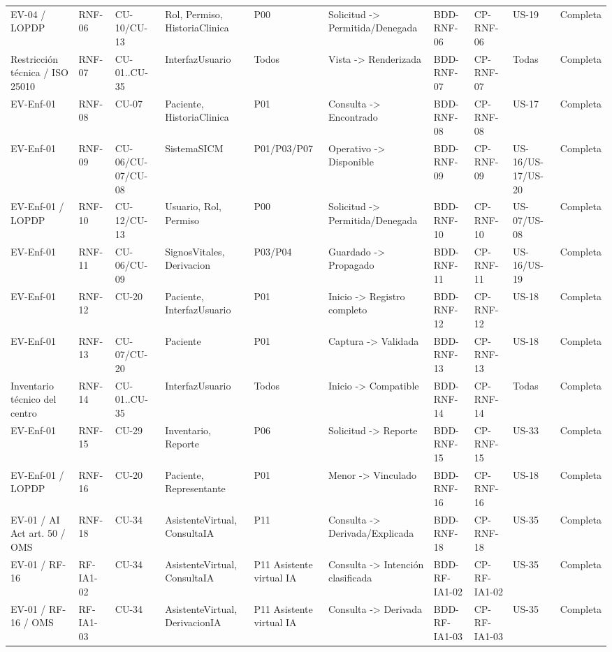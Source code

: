 \documentclass[11pt,a4paper]{article}
\begin{document}
\begin{appendices}
\begin{landscape}
\begin{longtable}{p{2.2cm}p{1.8cm}p{2cm}p{3cm}p{3cm}p{3cm}p{2cm}p{2cm}p{2cm}p{1.6cm}}
			EV-04 / LOPDP & RNF-06 & CU-10/CU-13 & Rol, Permiso, HistoriaClinica & P00 & Solicitud -> Permitida/Denegada & BDD-RNF-06 & CP-RNF-06 & US-19 & Completa\\
			Restricción técnica / ISO 25010 & RNF-07 & CU-01..CU-35 & InterfazUsuario & Todos & Vista -> Renderizada & BDD-RNF-07 & CP-RNF-07 & Todas & Completa\\
			EV-Enf-01 & RNF-08 & CU-07 & Paciente, HistoriaClinica & P01 & Consulta -> Encontrado & BDD-RNF-08 & CP-RNF-08 & US-17 & Completa\\
			EV-Enf-01 & RNF-09 & CU-06/CU-07/CU-08 & SistemaSICM & P01/P03/P07 & Operativo -> Disponible & BDD-RNF-09 & CP-RNF-09 & US-16/US-17/US-20 & Completa\\
			EV-Enf-01 / LOPDP & RNF-10 & CU-12/CU-13 & Usuario, Rol, Permiso & P00 & Solicitud -> Permitida/Denegada & BDD-RNF-10 & CP-RNF-10 & US-07/US-08 & Completa\\
			EV-Enf-01 & RNF-11 & CU-06/CU-09 & SignosVitales, Derivacion & P03/P04 & Guardado -> Propagado & BDD-RNF-11 & CP-RNF-11 & US-16/US-19 & Completa\\
			EV-Enf-01 & RNF-12 & CU-20 & Paciente, InterfazUsuario & P01 & Inicio -> Registro completo & BDD-RNF-12 & CP-RNF-12 & US-18 & Completa\\
			EV-Enf-01 & RNF-13 & CU-07/CU-20 & Paciente & P01 & Captura -> Validada & BDD-RNF-13 & CP-RNF-13 & US-18 & Completa\\
			Inventario técnico del centro & RNF-14 & CU-01..CU-35 & InterfazUsuario & Todos & Inicio -> Compatible & BDD-RNF-14 & CP-RNF-14 & Todas & Completa\\
			EV-Enf-01 & RNF-15 & CU-29 & Inventario, Reporte & P06 & Solicitud -> Reporte & BDD-RNF-15 & CP-RNF-15 & US-33 & Completa\\
			EV-Enf-01 / LOPDP & RNF-16 & CU-20 & Paciente, Representante & P01 & Menor -> Vinculado & BDD-RNF-16 & CP-RNF-16 & US-18 & Completa\\
			EV-01 / AI Act art. 50 / OMS & RNF-18 & CU-34 & AsistenteVirtual, ConsultaIA & P11 & Consulta -> Derivada/Explicada & BDD-RNF-18 & CP-RNF-18 & US-35 & Completa\\
			EV-01 / RF-16 & RF-IA1-02 & CU-34 & AsistenteVirtual, ConsultaIA & P11 Asistente virtual IA & Consulta -> Intención clasificada & BDD-RF-IA1-02 & CP-RF-IA1-02 & US-35 & Completa\\
			EV-01 / RF-16 / OMS & RF-IA1-03 & CU-34 & AsistenteVirtual, DerivacionIA & P11 Asistente virtual IA & Consulta -> Derivada & BDD-RF-IA1-03 & CP-RF-IA1-03 & US-35 & Completa\\

\end{longtable}
\end{landscape}
\end{appendices}
\end{document}
